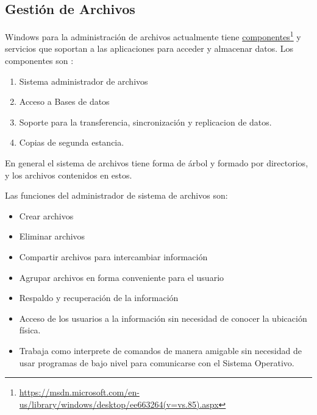 \documentclass[paper=a4, fontsize=12pt]{article} 		%
\newcommand\fnurl[2]{%
\href{#2}{#1}\footnote{\url{#2}}%
}
\numberwithin{equation}{section}						%
\numberwithin{table}{section} 							%
\begin{document}
\subsection{Gestión de Archivos}
Windows para la administración de archivos actualmente tiene \fnurl{componentes}{https://msdn.microsoft.com/en-us/library/windows/desktop/ee663264(v=vs.85).aspx} y servicios que soportan a las aplicaciones para acceder y almacenar datos. Los componentes son :
\begin{enumerate}
\item Sistema administrador de archivos
\item Acceso a Bases de datos
\item Soporte para la transferencia, sincronización y replicacion de datos.
\item Copias de segunda estancia. 
\end{enumerate}
En general el sistema de archivos tiene forma de árbol y formado por directorios, y los archivos contenidos en estos.

Las funciones del administrador de sistema de archivos son:
\begin{itemize}
\item Crear archivos
\item Eliminar  archivos
\item Compartir archivos para intercambiar información
\item Agrupar archivos en forma conveniente para el usuario
\item Respaldo y recuperación de la información
\item Acceso de los usuarios a la información sin necesidad de conocer la ubicación física.
\item Trabaja como interprete de comandos de manera amigable sin necesidad de usar programas de bajo nivel para comunicarse con el Sistema Operativo.
\end{itemize}
\end{document}
